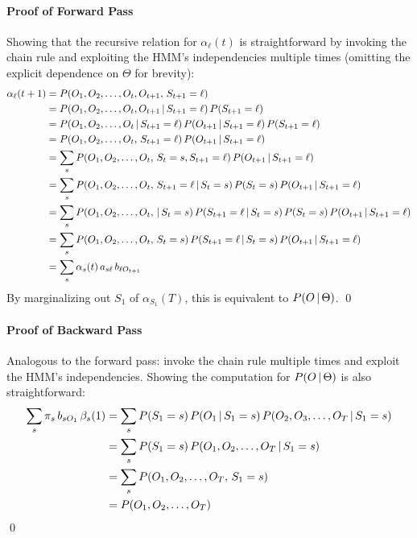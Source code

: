 			\paragraph{Proof of Forward Pass}
				Showing that the recursive relation for \( \alpha_\ell(t) \) is straightforward by invoking the chain rule and exploiting the HMM's independencies multiple times (omitting the explicit dependence on \(\Theta\) for brevity):
				\begin{align}
					\alpha_\ell(t + 1)
					 & = P(O_1, O_2, \dots, O_t, O_{t + 1},\, S_{t + 1} = \ell)                                                                                     \\
					 & = P(O_1, O_2, \dots, O_t, O_{t + 1} \,\vert\, S_{t + 1} = \ell) \, P(S_{t + 1} = \ell)                                                          \\
					 & = P(O_1, O_2, \dots, O_t \,\vert\, S_{t + 1} = \ell) \, P(O_{t + 1} \,\vert\, S_{t + 1} = \ell) \, P(S_{t + 1} = \ell)                             \\
					 & = P(O_1, O_2, \dots, O_t,\, S_{t + 1} = \ell) \, P(O_{t + 1} \,\vert\, S_{t + 1} = \ell)                                                        \\
					 & = \sum_s P(O_1, O_2, \dots, O_t,\, S_t = s, S_{t + 1} = \ell) \, P(O_{t + 1} \,\vert\, S_{t + 1} = \ell)                                        \\
					 & = \sum_s P(O_1, O_2, \dots, O_t,\, S_{t + 1} = \ell \,\vert\, S_t = s) \, P(S_t = s) \, P(O_{t + 1} \,\vert\, S_{t + 1} = \ell)                    \\
					 & = \sum_s P(O_1, O_2, \dots, O_t, \,\vert\, S_t = s) \, P(S_{t + 1} = \ell \,\vert\, S_t = s) \, P(S_t = s) \, P(O_{t + 1} \,\vert\, S_{t + 1} = \ell) \\
					 & = \sum_s P(O_1, O_2, \dots, O_t,\, S_t = s) \, P(S_{t + 1} = \ell \,\vert\, S_t = s) \, P(O_{t + 1} \,\vert\, S_{t + 1} = \ell)                    \\
					 & = \sum_s \alpha_s(t) \, a_{s \ell} \, b_{\ell O_{t + 1}}
				\end{align}
				By marginalizing out \(S_1\) of \( \alpha_{S_1}(T) \), this is equivalent to \( P(O \,\vert\, \Theta) \).
				\qed

			\paragraph{Proof of Backward Pass}
				Analogous to the forward pass: invoke the chain rule multiple times and exploit the HMM's independencies.
				Showing the computation for \( P(O \,\vert\, \Theta) \) is also straightforward:
				\begin{align}
					\sum_s \pi_s \, b_{s O_1} \, \beta_s(1)
					 & = \sum_s P(S_1 = s) \, P(O_1 \,\vert\, S_1 = s ) \, P(O_2, O_3, \dots, O_T \,\vert\, S_1 = s) \\
					 & = \sum_s P(S_1 = s) \, P(O_1, O_2, \dots, O_T \,\vert\, S_1 = s)                           \\
					 & = \sum_s P(O_1, O_2, \dots, O_T,\, S_1 = s)                                             \\
					 & = P(O_1, O_2, \dots, O_T)
				\end{align}
				\qed

